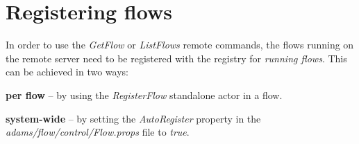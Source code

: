 \section{Registering flows}
In order to use the \textit{GetFlow} or \textit{ListFlows} remote commands,
the flows running on the remote server need to be registered with the
registry for \textit{running flows}. This can be achieved in two ways:
\begin{tight_itemize}
  \item \textbf{per flow} -- by using the \textit{RegisterFlow} standalone
  actor in a flow.
  \item \textbf{system-wide} -- by setting the \textit{AutoRegister} property
  in the \textit{adams/flow/control/Flow.props} file to \textit{true}.
\end{tight_itemize}


